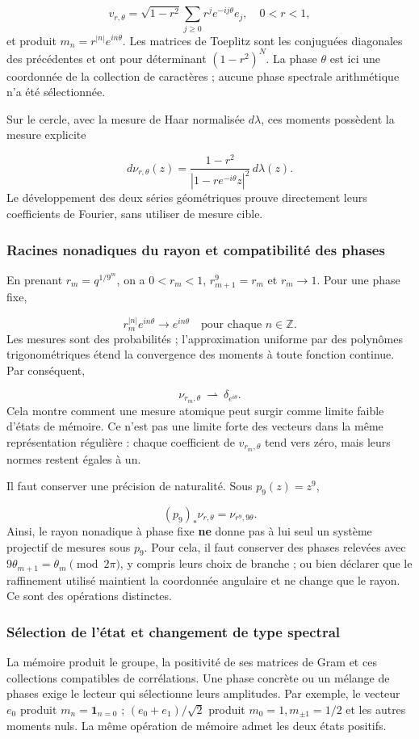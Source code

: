 \[
v_{r,\theta}=\sqrt{1-r^2}\sum_{j\ge0}r^j e^{-ij\theta}e_j,
\quad 0<r<1,
\]
et produit \(m_n=r^{|n|}e^{in\theta}\). Les matrices de Toeplitz sont les conjuguées diagonales des précédentes et ont pour déterminant \((1-r^2)^N\). La phase \(\theta\) est ici une coordonnée de la collection de caractères ; aucune phase spectrale arithmétique n'a été sélectionnée.

Sur le cercle, avec la mesure de Haar normalisée \(d\lambda\), ces moments possèdent la mesure explicite

\[
d\nu_{r,\theta}(z)
=\frac{1-r^2}{|1-r e^{-i\theta}z|^2}\,d\lambda(z).
\]
Le développement des deux séries géométriques prouve directement leurs coefficients de Fourier, sans utiliser de mesure cible.


\subsubsection{Racines nonadiques du rayon et compatibilité des phases}
\label{tm-add-m3-1}
En prenant \(r_m=q^{1/9^m}\), on a \(0<r_m<1\), \(r_{m+1}^{9}=r_m\) et \(r_m\to1\). Pour une phase fixe,

\[
r_m^{|n|}e^{in\theta}\longrightarrow e^{in\theta}
\quad\text{pour chaque }n\in\mathbb Z.
\]
Les mesures sont des probabilités ; l'approximation uniforme par des polynômes trigonométriques étend la convergence des moments à toute fonction continue. Par conséquent,

\[
\nu_{r_m,\theta}\ \rightharpoonup\ \delta_{e^{i\theta}}.
\]
Cela montre comment une mesure atomique peut surgir comme limite faible d'états de mémoire. Ce n'est pas une limite forte des vecteurs dans la même représentation régulière : chaque coefficient de \(v_{r_m,\theta}\) tend vers zéro, mais leurs normes restent égales à un.

Il faut conserver une précision de naturalité. Sous \(p_9(z)=z^9\),

\[
(p_9)_*\nu_{r,\theta}=\nu_{r^9,9\theta}.
\]
Ainsi, le rayon nonadique à phase fixe \textbf{ne} donne pas à lui seul un système projectif de mesures sous \(p_9\). Pour cela, il faut conserver des phases relevées avec \(9\theta_{m+1}=\theta_m\pmod{2\pi}\), y compris leurs choix de branche ; ou bien déclarer que le raffinement utilisé maintient la coordonnée angulaire et ne change que le rayon. Ce sont des opérations distinctes.


\subsubsection{Sélection de l'état et changement de type spectral}
\label{tm-add-m3-2}
La mémoire produit le groupe, la positivité de ses matrices de Gram et ces collections compatibles de corrélations. Une phase concrète ou un mélange de phases exige le lecteur qui sélectionne leurs amplitudes. Par exemple, le vecteur \(e_0\) produit \(m_n=\mathbf1_{n=0}\) ; \((e_0+e_1)/\sqrt2\) produit \(m_0=1,m_{\pm1}=1/2\) et les autres moments nuls. La même opération de mémoire admet les deux états positifs.

